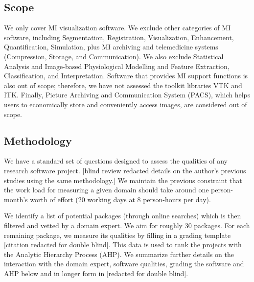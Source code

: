 \documentclass[final, 12pt, 3p, times]{elsarticle}
\begin{document}
\subsection{Scope} \label{sec_scope}

We only cover MI visualization software.  We exclude other categories of MI
software, including Segmentation, Registration, Visualization, Enhancement,
Quantification, Simulation, plus MI archiving and telemedicine systems
(Compression, Storage, and Communication).  We also exclude Statistical Analysis
and Image-based Physiological Modelling and Feature Extraction, Classification,
and Interpretation. Software that provides MI support functions is also out of
scope; therefore, we have not assessed the toolkit libraries VTK and ITK.
Finally, Picture Archiving and Communication System (PACS), which helps users to
economically store and conveniently access images, are considered out of scope. 

\subsection{Methodology} \label{SecMethodology}

We have a standard set of questions designed to assess the qualities of any
research software project.  [blind review redacted details on the author's
previous studies using the same methodology.]
We maintain
the previous constraint that the work load for measuring a given domain should
take around one person-month's worth of effort ($20$ working days at $8$
person-hours per day).

We identify a list of potential packages (through online searches) which is then
filtered and vetted by a domain expert. We aim for roughly $30$ packages. For
each remaining package, we measure its qualities by filling in a grading
template [citation redacted for double blind]. %
This data is used to rank the projects with the
Analytic Hierarchy Process (AHP).  We summarize further details on the
interaction with the domain expert, software qualities, grading the software and
AHP below and in longer form in [redacted for double blind].
\end{document}
